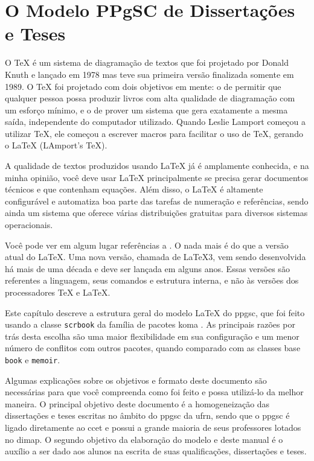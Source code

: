 \chapter{O Modelo PPgSC de Dissertações e Teses}\label{cap:modelo}

O \TeX{} \parencite{Knuth1984} é um sistema de diagramação de textos que foi projetado por Donald Knuth e lançado em 1978 mas teve sua primeira versão finalizada somente em 1989. O \TeX{} foi projetado com dois objetivos em mente: o de permitir que qualquer pessoa possa produzir livros com alta qualidade de diagramação com um esforço mínimo, e o de prover um sistema que gera exatamente a mesma saída, independente do computador utilizado. Quando Leslie Lamport começou a utilizar \TeX{}, ele começou a escrever macros para facilitar o uso de \TeX{}, gerando o \LaTeX{} \parencite{Lamport1994} (LAmport's \TeX{}).

A qualidade de textos produzidos usando \LaTeX{} já é amplamente conhecida, e na minha opinião, você deve usar \LaTeX{} principalmente se precisa gerar documentos técnicos e que contenham equações. Além disso, o \LaTeX{} é altamente configurável e automatiza boa parte das tarefas de numeração e referências, sendo ainda um sistema que oferece várias distribuições gratuitas para diversos sistemas operacionais.

Você pode ver em algum lugar referências a \LaTeXe{}. O \LaTeXe{} nada mais é do que a versão atual do \LaTeX{}. Uma nova versão, chamada de \LaTeX{}3, vem sendo desenvolvida há mais de uma década e deve ser lançada em alguns anos. Essas versões são referentes a linguagem, seus comandos e estrutura interna, e não às versões dos processadores \TeX{} e \LaTeX{}.

Este capítulo descreve a estrutura geral do modelo \LaTeX{} do \gls{ppgsc}, que foi feito usando a classe \texttt{scrbook} da família de pacotes \gls{koma} \parencite{koma}. As principais razões por trás desta escolha são uma maior flexibilidade em sua configuração e um menor número de conflitos com outros pacotes, quando comparado com as classes base \texttt{book} e \texttt{memoir}. 

Algumas explicações sobre os objetivos e formato deste documento são necessárias para que você compreenda como foi feito e possa utilizá-lo da melhor maneira. O principal objetivo deste documento é a homogeneização das dissertações e teses escritas no âmbito do \gls{ppgsc} da \gls{ufrn}, sendo que o \gls{ppgsc} é ligado diretamente ao \gls{ccet} e possui a grande maioria de seus professores lotados no \gls{dimap}. O segundo objetivo da elaboração do modelo e deste manual é o auxílio a ser dado aos alunos na escrita de suas qualificações, dissertações e teses.

